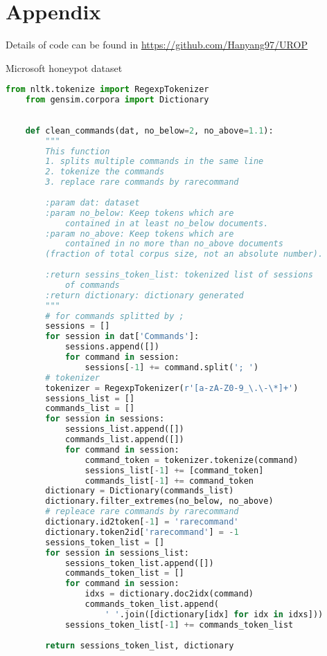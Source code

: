 \appendix
\chapter{Appendix}
Details of code can be found in \href{https://github.com/Hanyang97/UROP}{https://github.com/Hanyang97/UROP}
\\
\begin{table}[h]
    \centering
    
    \caption{Microsoft honeypot dataset}
    \label{tab:headdf}
\end{table}

\begin{lstlisting}[language=Python, caption={Python code for tokeniser}, label={lst:tokeniser},captionpos=b]
    from nltk.tokenize import RegexpTokenizer
    from gensim.corpora import Dictionary
    
    
    def clean_commands(dat, no_below=2, no_above=1.1):
        """
        This function 
        1. splits multiple commands in the same line
        2. tokenize the commands
        3. replace rare commands by rarecommand
    
        :param dat: dataset
        :param no_below: Keep tokens which are 
            contained in at least no_below documents.
        :param no_above: Keep tokens which are 
            contained in no more than no_above documents 
        (fraction of total corpus size, not an absolute number).
    
        :return sessins_token_list: tokenized list of sessions 
            of commands
        :return dictionary: dictionary generated
        """
        # for commands splitted by ;
        sessions = []
        for session in dat['Commands']:
            sessions.append([])
            for command in session:
                sessions[-1] += command.split('; ')
        # tokenizer
        tokenizer = RegexpTokenizer(r'[a-zA-Z0-9_\.\-\*]+')
        sessions_list = []
        commands_list = []
        for session in sessions:
            sessions_list.append([])
            commands_list.append([])
            for command in session:
                command_token = tokenizer.tokenize(command)
                sessions_list[-1] += [command_token]
                commands_list[-1] += command_token
        dictionary = Dictionary(commands_list)
        dictionary.filter_extremes(no_below, no_above)
        # repleace rare commands by rarecommand
        dictionary.id2token[-1] = 'rarecommand'
        dictionary.token2id['rarecommand'] = -1
        sessions_token_list = []
        for session in sessions_list:
            sessions_token_list.append([])
            commands_token_list = []
            for command in session:
                idxs = dictionary.doc2idx(command)
                commands_token_list.append(
                    ' '.join([dictionary[idx] for idx in idxs]))
            sessions_token_list[-1] += commands_token_list
    
        return sessions_token_list, dictionary
\end{lstlisting}

